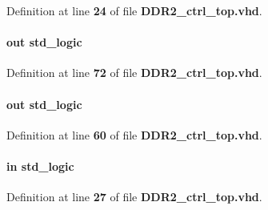 Definition at line {\bf 24} of file {\bf D\+D\+R2\+\_\+ctrl\+\_\+top.\+vhd}.

\paragraph[{pass}]{ {\bfseries \textcolor{keywordflow}{out}\textcolor{vhdlchar}{ }} {\bfseries \textcolor{comment}{std\+\_\+logic}\textcolor{vhdlchar}{ }} \hspace{0.3cm}{\ttfamily [Port]}}\label{classDDR2__ctrl__top_a6f74b23545eddf571f51af4b1b13467c}


Definition at line {\bf 72} of file {\bf D\+D\+R2\+\_\+ctrl\+\_\+top.\+vhd}.

\paragraph[{phy\+\_\+clk}]{ {\bfseries \textcolor{keywordflow}{out}\textcolor{vhdlchar}{ }} {\bfseries \textcolor{comment}{std\+\_\+logic}\textcolor{vhdlchar}{ }} \hspace{0.3cm}{\ttfamily [Port]}}\label{classDDR2__ctrl__top_a2ce29158e59eba76943608a73997e9bc}


Definition at line {\bf 60} of file {\bf D\+D\+R2\+\_\+ctrl\+\_\+top.\+vhd}.

\paragraph[{pll\+\_\+ref\+\_\+clk}]{ {\bfseries \textcolor{keywordflow}{in}\textcolor{vhdlchar}{ }} {\bfseries \textcolor{comment}{std\+\_\+logic}\textcolor{vhdlchar}{ }} \hspace{0.3cm}{\ttfamily [Port]}}\label{classDDR2__ctrl__top_ae692cce64f02bb21817ff05dc00a19b9}


Definition at line {\bf 27} of file {\bf D\+D\+R2\+\_\+ctrl\+\_\+top.\+vhd}.

